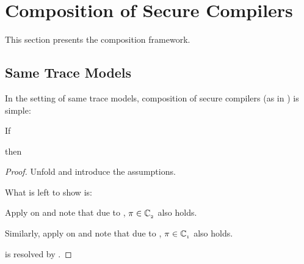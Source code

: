 \section{Composition of Secure Compilers}\label{sec:rtpc}

This section presents the composition framework.

\subsection{Same Trace Models}\label{subsec:rtpc-same-trace-models}

In the setting of same trace models, composition of secure compilers (as in ) is simple:

\begin{lemma}[\Coqed]{}
  If 
  \begin{assumptions}
  \end{assumptions}
  then
  \begin{goals}
  \end{goals}
\end{lemma}
\begin{proof}
  Unfold  and introduce the assumptions. 
  \begin{passumptions}
  \end{passumptions}
  What is left to show is:
  \begin{goals}
  \end{goals}
  Apply  on  and note that due to , $\varProperty\in\varClass[_2]$ also holds.
  \begin{goals}
  \end{goals}
  Similarly, apply  on  and note that due to , $\varProperty\in\varClass[_1]$ also holds.
  \begin{goals}
  \end{goals}
   is resolved by .
\end{proof}
